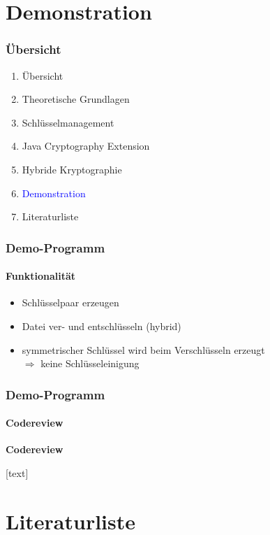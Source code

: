 \documentclass{beamer}
\begin{document}
\section{Demonstration}
\begin{frame}
\frametitle{Übersicht}
\begin{enumerate}
\item Übersicht
\item Theoretische Grundlagen
\item Schlüsselmanagement
\item Java Cryptography Extension
\item Hybride Kryptographie
\item \textcolor{blue}{Demonstration}
\item Literaturliste
\end{enumerate}
\end{frame}

\begin{frame}
\frametitle{Demo-Programm}
\framesubtitle{Funktionalität}
\begin{itemize}
\item Schlüsselpaar erzeugen
\item Datei ver- und entschlüsseln (hybrid)\\
\item symmetrischer Schlüssel wird beim Verschlüsseln erzeugt\\
$\Rightarrow$ keine Schlüsseleinigung
\end{itemize}
\end{frame}

\begin{frame}
\frametitle{Demo-Programm}
\framesubtitle{Codereview}
\begin{center}
\Large \textbf{Codereview} \normalsize
\end{center} 
\end{frame}

[text]
\section{Literaturliste}
\begin{frame}
\nocite{Eckert13}
\nocite{Engelbrecht04}
{}

\end{frame}
\end{document}
